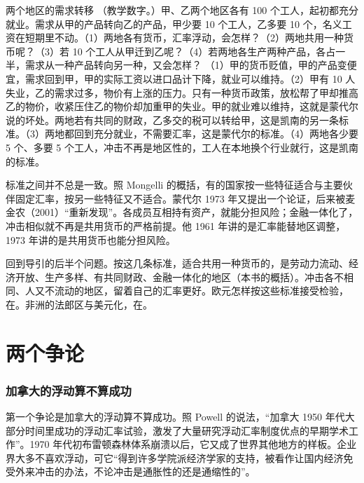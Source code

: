 \begin{example}{两个地区的需求转移}\label{ex:mundell-oca}
（教学数字。）甲、乙两个地区各有 100 个工人，起初都充分就业。需求从甲的产品转向乙的产品，甲少要 10 个工人，乙多要 10 个，名义工资在短期里不动。（1）两地各有货币，汇率浮动，会怎样？（2）两地共用一种货币呢？（3）若 10 个工人从甲迁到乙呢？（4）若两地各生产两种产品，各占一半，需求从一种产品转向另一种，又会怎样？
\solution
（1）甲的货币贬值，甲的产品变便宜，需求回到甲，甲的实际工资以进口品计下降，就业可以维持。（2）甲有 10 人失业，乙的需求过多，物价有上涨的压力。只有一种货币政策，放松帮了甲却推高乙的物价，收紧压住乙的物价却加重甲的失业。甲的就业难以维持，这就是蒙代尔说的坏处。两地若有共同的财政，乙多交的税可以转给甲，这是凯南的另一条标准。（3）两地都回到充分就业，不需要汇率，这是蒙代尔的标准。（4）两地各少要 5 个、多要 5 个工人，冲击不再是地区性的，工人在本地换个行业就行，这是凯南的标准。
\end{example}

标准之间并不总是一致。照 Mongelli 的概括，有的国家按一些特征适合与主要伙伴固定汇率，按另一些特征又不适合\cite{mongelli2002}。蒙代尔 1973 年又提出一个论证，后来被麦金农（2001）“重新发现”\cite{mongelli2002}。各成员互相持有资产，就能分担风险；金融一体化了，冲击相似就不再是共用货币的严格前提\cite{mongelli2002}。他 1961 年讲的是汇率能替地区调整，1973 年讲的是共用货币也能分担风险。

回到导引的后半个问题。按这几条标准，适合共用一种货币的，是劳动力流动、经济开放、生产多样、有共同财政、金融一体化的地区（本书的概括）。冲击各不相同、人又不流动的地区，留着自己的汇率更好。欧元怎样按这些标准接受检验，在。非洲的法郎区与美元化，在。

\section{两个争论}\label{sec:mundell-debate}

\subsubsection{加拿大的浮动算不算成功}

第一个争论是加拿大的浮动算不算成功。照 Powell 的说法，“加拿大 1950 年代大部分时间里成功的浮动汇率试验，激发了大量研究浮动汇率制度优点的早期学术工作”\cite{powell2005}。1970 年代初布雷顿森林体系崩溃以后，它又成了世界其他地方的样板\cite{powell2005}。企业界大多不喜欢浮动，可它“得到许多学院派经济学家的支持，被看作让国内经济免受外来冲击的办法，不论冲击是通胀性的还是通缩性的”\cite{powell2005}。

